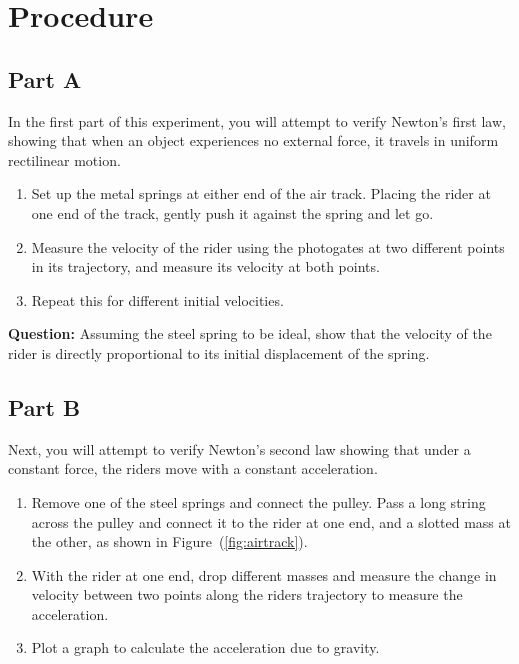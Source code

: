 \section*{Procedure}
\subsection*{Part A}

In the first part of this experiment, you will attempt to verify Newton's first law, showing that when an object experiences no external force, it travels in uniform rectilinear motion.

\begin{enumerate}
    \item Set up the metal springs at either end of the air track. Placing the rider at one end of the track, gently push it against the spring and let go.
    
    \item Measure the velocity of the rider using the photogates at two different points in its trajectory, and measure its velocity at both points.
    
    \item Repeat this for different initial velocities.
\end{enumerate}

\begin{question}
 \textbf{Question:} Assuming the steel spring to be ideal, show that the velocity of the rider is directly proportional to its initial displacement of the spring.
\end{question}

\subsection*{Part B}

Next, you will attempt to verify Newton's second law showing that under a constant force, the riders move with a constant acceleration.

\begin{enumerate}
    \item Remove one of the steel springs and connect the pulley. Pass a long string across the pulley and connect it to the rider at one end, and a slotted mass at the other, as shown in Figure~(\ref{fig:airtrack}).
    
    \item With the rider at one end, drop different masses and measure the change in velocity between two points along the riders trajectory to measure the acceleration.
    
    \item Plot a graph to calculate the acceleration due to gravity.
\end{enumerate}

